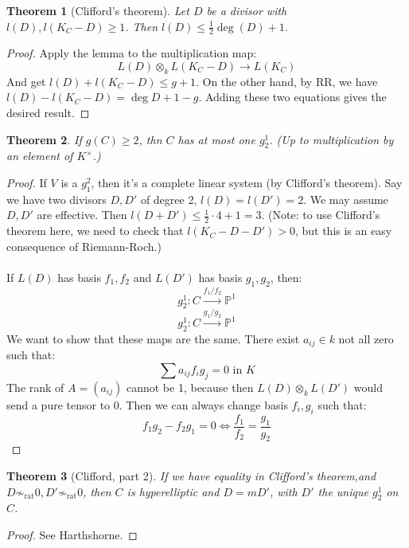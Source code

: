 \documentclass{article}
\newcommand{\Proj}{\mathbb{P}}
\theoremstyle{plain}
\newtheorem*{thm*}{Theorem}
\theoremstyle{definition}
\theoremstyle{remark}
\begin{document}
\begin{thm*}  [Clifford's theorem]
Let $D$ be a divisor with $l(D), l(K_C - D) \geq 1$. Then $l(D) \leq \frac{1}{2} \deg(D) + 1$.
\end{thm*}
\begin{proof}
Apply the lemma to the multiplication map:
\[     L(D) \otimes_k L(K_C - D) \to L(K_C)    \]
And get $l(D) + l(K_C - D) \leq g+1$. On the other hand, by RR, we have $l(D) - l(K_C - D) = \deg D + 1 - g$. Adding these two equations gives the desired result.
\end{proof}

\begin{thm*}
If $g(C) \geq 2$, thn $C$ has at most one $g_2^1$. (Up to multiplication by an element of $K^{\times}$.)
\end{thm*}
\begin{proof}
If $V$ is a $g_1^2$, then it's a complete linear system (by Clifford's theorem). Say we have two divisors $D,D'$ of degree 2, $l(D) = l(D') = 2$. We may assume $D,D'$ are effective. Then $l(D+D') \leq \frac{1}{2} \cdot 4 + 1 = 3$. (Note: to use Clifford's theorem here, we need to check that $l(K_C - D - D') >0$, but this is an easy consequence of Riemann-Roch.)
\\
\\
If $L(D)$ has basis $f_1, f_2$ and $L(D')$ has basis $g_1, g_2$, then:
\[         g_2^1 : C \overset{f_1/f_2}{\to} \Proj^1        \]
\[         g_2^1 : C \overset{g_1/g_2}{\to} \Proj^1        \]
We want to show that these maps are the same. There exist $a_{ij} \in k$ not all zero such that:
\[       \sum a_{ij} f_i g_j = 0  \text{     in } K     \]
The rank of $A = (a_{ij})$ cannot be 1, because then $L(D) \otimes_{k} L(D')$ would send a pure tensor to 0. Then we can always change basis $f_i, g_i$ such that:
\[       f_1 g_2 - f_2 g_1 = 0 \Leftrightarrow \frac{f_1}{f_2} = \frac{g_1}{g_2}   \]
\end{proof}

\begin{thm*} [Clifford, part 2]
If we have equality in Clifford's theorem,and $D \not \sim_{\text{rat}} 0, D' \not \sim_{\text{rat}} 0$, then $C$ is hyperelliptic and $D = mD'$, with $D'$ the unique $g_2^1$ on $C$.
\end{thm*}
\begin{proof}
See Harthshorne.
\end{proof}
\end{document}
